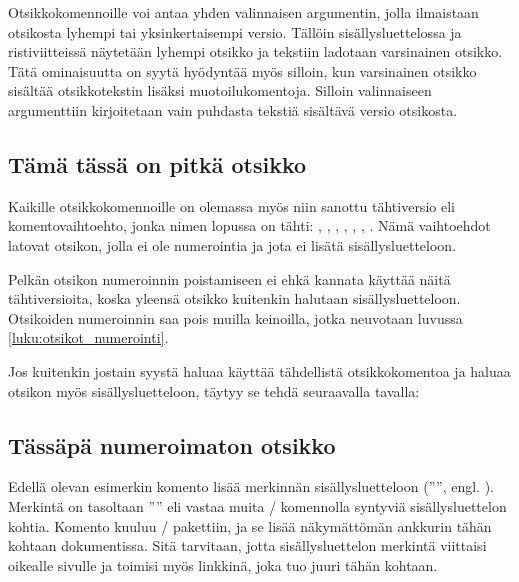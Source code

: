 Otsikkokomennoille voi antaa yhden valinnaisen argumentin, jolla
ilmaistaan otsikosta lyhempi tai yksinkertaisempi versio. Tällöin
sisällysluettelossa ja ristiviitteissä näytetään lyhempi otsikko ja
tekstiin ladotaan varsinainen otsikko. Tätä ominaisuutta on syytä
hyödyntää myös silloin, kun varsinainen otsikko sisältää otsikkotekstin
lisäksi muotoilukomentoja. Silloin valinnaiseen argumenttiin
kirjoitetaan vain puhdasta tekstiä sisältävä versio otsikosta.

\begin{koodilohkosis}
  \section[Lyhyt otsikko]{Tämä tässä on pitkä otsikko}
\end{koodilohkosis}

Kaikille otsikkokomennoille on olemassa myös niin sanottu tähtiversio
eli komentovaihtoehto, jonka nimen lopussa on tähti: ,
, , ,
, , .
Nämä vaihtoehdot latovat otsikon, jolla ei ole numerointia ja jota ei
lisätä sisällysluetteloon.

Pelkän otsikon numeroinnin poistamiseen ei ehkä kannata käyttää näitä
tähtiversioita, koska yleensä otsikko kuitenkin halutaan
sisällysluetteloon. Otsikoiden numeroinnin saa pois muilla keinoilla,
jotka neuvotaan luvussa \ref{luku:otsikot_numerointi}.

Jos kuitenkin jostain syystä haluaa käyttää tähdellistä otsikkokomentoa
ja haluaa otsikon myös sisällysluetteloon, täytyy se tehdä seuraavalla
tavalla:

\begin{koodilohkosis}
  \section*{Tässäpä numeroimaton otsikko}
\end{koodilohkosis}

Edellä olevan esimerkin komento  lisää
merkinnän sisällysluetteloon ('''', engl.
). Merkintä on tasoltaan
'''' eli vastaa muita \-/ komennolla
syntyviä sisällysluettelon kohtia. Komento 
kuuluu \-/ pakettiin, ja se lisää näkymättömän
ankkurin tähän kohtaan dokumentissa. Sitä tarvitaan, jotta
sisällysluettelon merkintä viittaisi oikealle sivulle ja toimisi myös
linkkinä, joka tuo juuri tähän kohtaan.

